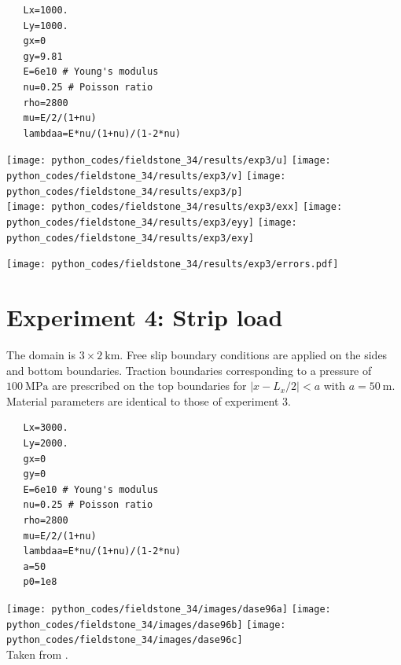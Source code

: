 \begin{lstlisting}
   Lx=1000.  
   Ly=1000.
   gx=0
   gy=9.81
   E=6e10 # Young's modulus
   nu=0.25 # Poisson ratio
   rho=2800
   mu=E/2/(1+nu)
   lambdaa=E*nu/(1+nu)/(1-2*nu)
\end{lstlisting}


\begin{center}
\texttt{[image: python\_codes/fieldstone\_34/results/exp3/u]}
\texttt{[image: python\_codes/fieldstone\_34/results/exp3/v]}
\texttt{[image: python\_codes/fieldstone\_34/results/exp3/p]}\\
\texttt{[image: python\_codes/fieldstone\_34/results/exp3/exx]}
\texttt{[image: python\_codes/fieldstone\_34/results/exp3/eyy]}
\texttt{[image: python\_codes/fieldstone\_34/results/exp3/exy]}
\end{center}

\begin{center}
\texttt{[image: python\_codes/fieldstone\_34/results/exp3/errors.pdf]}
\end{center}


\section*{Experiment 4: Strip load}

The domain is $3 \times 2~\si{\km}$. Free slip boundary conditions are 
applied on the sides and bottom boundaries. 
Traction boundaries corresponding to a pressure of $\SI{100}{\mega\pascal}$
are prescribed on the top boundaries for $|x-L_x/2|<a$ with $a=\SI{50}{\meter}$.
Material parameters are identical to those of experiment 3.

\begin{lstlisting}
   Lx=3000.  
   Ly=2000.
   gx=0
   gy=0
   E=6e10 # Young's modulus
   nu=0.25 # Poisson ratio
   rho=2800
   mu=E/2/(1+nu)
   lambdaa=E*nu/(1+nu)/(1-2*nu)
   a=50
   p0=1e8
\end{lstlisting}

\begin{center}
\texttt{[image: python\_codes/fieldstone\_34/images/dase96a]}
\texttt{[image: python\_codes/fieldstone\_34/images/dase96b]}
\texttt{[image: python\_codes/fieldstone\_34/images/dase96c]}\\
{\captionfont Taken from \textcite{dase96}.}
\end{center}

